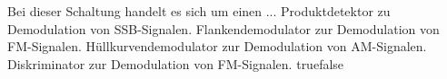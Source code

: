     {Bei dieser Schaltung handelt es sich um einen ...}
    {Produktdetektor zu Demodulation von SSB-Signalen.}
    {Flankendemodulator zur Demodulation von FM-Signalen.}
    {Hüllkurvendemodulator zur Demodulation von AM-Signalen.}
    {Diskriminator zur Demodulation von FM-Signalen.}
    {true}{false}